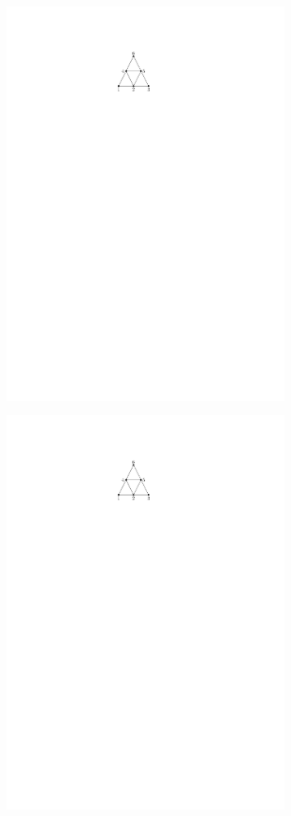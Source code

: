 \begin{figure}[H]
	\centering
	\begin{subfigure}{0.7\textwidth}
		\centering
		\includegraphics[page=1,width=0.5\linewidth]{graphics/preliminaries_drawing_models.pdf}
		\caption{}\label{im:drawing_models_a}
	\end{subfigure}
\begin{subfigure}{0.4\textwidth}
	\centering
	\includegraphics[page=2,width=\linewidth]{graphics/preliminaries_drawing_models.pdf}

\end{subfigure}
\end{figure}
